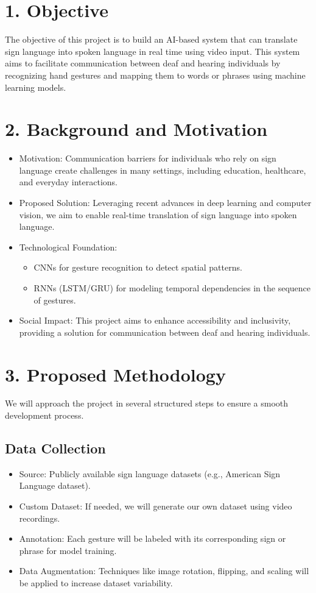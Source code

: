 \documentclass{article}
\begin{document}
\section*{1. Objective} 
The objective of this project is to build an AI-based system that can translate sign language into spoken language in real time using video input. This system aims to facilitate communication between deaf and hearing individuals by recognizing hand gestures and mapping them to words or phrases using machine learning models.

\section*{2. Background and Motivation} 
\begin{itemize}
    \item Motivation: Communication barriers for individuals who rely on sign language create challenges in many settings, including education, healthcare, and everyday interactions.
    \item Proposed Solution: Leveraging recent advances in deep learning and computer vision, we aim to enable real-time translation of sign language into spoken language.
    \item Technological Foundation:
        \begin{itemize}
            \item CNNs for gesture recognition to detect spatial patterns.
            \item RNNs (LSTM/GRU) for modeling temporal dependencies in the sequence of gestures.
        \end{itemize}
    \item Social Impact: This project aims to enhance accessibility and inclusivity, providing a solution for communication between deaf and hearing individuals.
\end{itemize}

\section*{3. Proposed Methodology} 
We will approach the project in several structured steps to ensure a smooth development process.

\subsection*{Data Collection} 
\begin{itemize}
    \item Source: Publicly available sign language datasets (e.g., American Sign Language dataset).
    \item Custom Dataset: If needed, we will generate our own dataset using video recordings.
    \item Annotation: Each gesture will be labeled with its corresponding sign or phrase for model training.
    \item Data Augmentation: Techniques like image rotation, flipping, and scaling will be applied to increase dataset variability.
\end{itemize}
\end{document}
